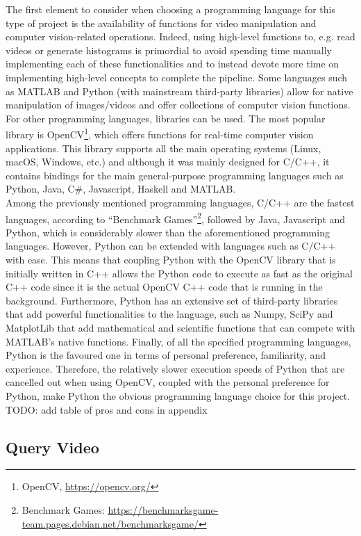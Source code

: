 The first element to consider when choosing a programming language for this type of project is the availability of functions for video manipulation and computer vision-related operations. Indeed, using high-level functions to, e.g. read videos or generate histograms is primordial to avoid spending time manually implementing each of these functionalities and to instead devote more time on implementing high-level concepts to complete the pipeline. Some languages such as MATLAB and Python (with mainstream third-party libraries) allow for native manipulation of images/videos and offer collections of computer vision functions. For other programming languages, libraries can be used. The most popular library is OpenCV\footnote{OpenCV, \url{https://opencv.org/}}, which offers functions for real-time computer vision applications. This library supports all the main operating systems (Linux, macOS, Windows, etc.) and although it was mainly designed for C/C++, it contains bindings for the main general-purpose programming languages such as Python, Java, C\#, Javascript, Haskell and MATLAB.\\

Among the previously mentioned programming languages, C/C++ are the fastest languages,
according to ``Benchmark Games''\footnote{Benchmark Games: \url{https://benchmarksgame-team.pages.debian.net/benchmarksgame/}}, followed by Java, Javascript and Python, which is considerably slower than the aforementioned programming languages. However, Python can be extended with languages such as C/C++ with ease. This means that coupling Python with the OpenCV library that is initially written in C++ allows the Python code to execute as fast as the original C++ code since it is the actual OpenCV C++ code that is running in the background. Furthermore, Python has an extensive set of third-party libraries that add powerful functionalities to the language, such as Numpy, SciPy and MatplotLib that add mathematical and scientific functions that can compete with MATLAB's native functions. Finally, of all the specified programming languages, Python is the favoured one in terms of personal preference, familiarity, and experience. Therefore, the relatively slower execution speeds of Python that are cancelled out when using OpenCV, coupled with the personal preference for Python, make Python the obvious programming language choice for this project.\\

TODO: add table of pros and cons in appendix

\subsection{Query Video}

